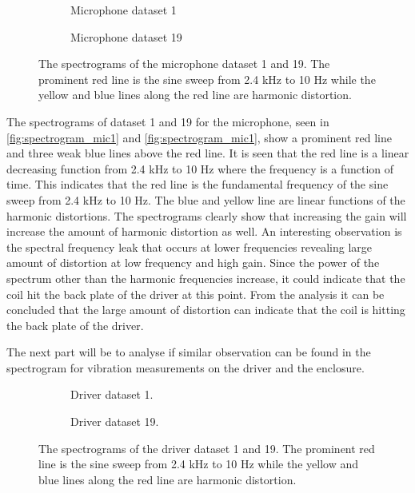 \begin{figure}[H]
\centering
\begin{subfigure}[t]{0.47\textwidth}
	
	\caption{Microphone dataset 1}
	\label{fig:spectrogram_mic1}
\end{subfigure}
\begin{subfigure}[t]{0.47\textwidth}
	
	\caption{Microphone dataset 19}
	\label{fig:spectrogram_mic19}
\end{subfigure}
\caption{The spectrograms of the microphone dataset 1 and 19. The prominent red line is the sine sweep from 2.4 kHz to 10 Hz while the yellow and blue lines along the red line are harmonic distortion.}
\label{fig:spec_mic}
\end{figure} 

The spectrograms of dataset 1 and 19 for the microphone, seen in \autoref{fig:spectrogram_mic1} and \autoref{fig:spectrogram_mic1}, show a prominent red line and three weak blue lines above the red line. It is seen that the red line is a linear decreasing function from 2.4 kHz to 10 Hz where the frequency is a function of time. This indicates that the red line is the fundamental frequency of the sine sweep from 2.4 kHz to 10 Hz. The blue and yellow line are linear functions of the harmonic distortions. The spectrograms clearly show that increasing the gain will increase the amount of harmonic distortion as well. An interesting observation is the spectral frequency leak that occurs at lower frequencies revealing large amount of distortion at low frequency and high gain. Since the power of the spectrum other than the harmonic frequencies increase, it could indicate that the coil hit the back plate of the driver at this point. From the analysis it can be concluded that the large amount of distortion can indicate that the coil is hitting the back plate of the driver.

The next part will be to analyse if similar observation can be found in the spectrogram for vibration measurements on the driver and the enclosure. 

\begin{figure}[H]
\centering
\begin{subfigure}[t]{0.47\textwidth}
	
	\caption{Driver dataset 1.}
	\label{fig:spectrogram_driver1}
\end{subfigure}
\begin{subfigure}[t]{0.47\textwidth}
	
	\caption{Driver dataset 19.}
	\label{fig:spectrogram_driver19}
\end{subfigure}
\caption{The spectrograms of the driver dataset 1 and 19. The prominent red line is the sine sweep from 2.4 kHz to 10 Hz while the yellow and blue lines along the red line are harmonic distortion.}
\label{fig:spec_driver}
\end{figure} 

